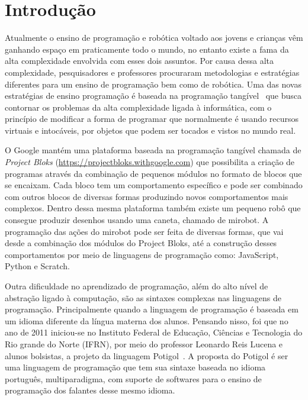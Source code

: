 \chapter{Introdução}
\label{cap:introducao}

Atualmente o ensino de programação e robótica voltado aos jovens e crianças vêm
ganhando espaço em praticamente todo o mundo, no entanto existe a fama da
alta complexidade envolvida com esses dois assuntos. Por causa dessa alta
complexidade, pesquisadores e professores procuraram metodologias e
estratégias diferentes para um ensino de programação bem como de robótica.
Uma das novas estratégias de ensino programação é baseada na
programação tangível~\cite{Horn2007} que busca contornar os problemas da alta complexidade ligada à informática, com o princípio de modificar a forma de programar que
normalmente é usando recursos virtuais e intocáveis, por objetos que podem ser
tocados e vistos no mundo real.


O Google mantém uma plataforma baseada na programação tangível chamada de \textit{Project Bloks} (\url{https://projectbloks.withgoogle.com}) 
que possibilita a criação de programas através da
combinação de pequenos módulos no formato de blocos que se encaixam. 
Cada bloco tem um comportamento específico e pode ser combinado com outros blocos de diversas formas
produzindo novos comportamentos mais complexos.
Dentro dessa mesma plataforma também existe um pequeno robô que consegue produzir desenhos usando uma caneta, chamado de mirobot. A programação das ações do mirobot pode ser feita de diversas formas, que vai desde a combinação dos módulos do Project Bloks, até a construção
desses comportamentos por meio de linguagens de programação como: JavaScript,
Python e Scratch.

Outra dificuldade no aprendizado de programação, além do alto nível de
abstração ligado à computação, são as sintaxes complexas nas linguagens
de programação. Principalmente quando a linguagem de programação é baseada em um
idioma diferente da língua materna dos alunos. Pensando nisso, foi que no ano de
2011 iniciou-se no Instituto Federal de Educação, Ciências e Tecnologia do Rio
grande do Norte (IFRN), por meio do professor Leonardo Reis Lucena e alunos
bolsistas, a projeto da linguagem Potigol~\cite{potigol}. A proposta do Potigol é ser uma
linguagem de programação que tem sua sintaxe baseada no idioma português, multiparadigma, com suporte de softwares para o ensino de programação dos falantes desse mesmo idioma.

